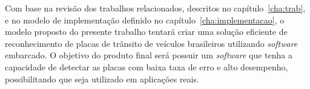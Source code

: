 Com base na revisão dos trabalhos relacionados, descritos no capítulo~\ref{cha:trab},
e no modelo de implementação definido no capítulo~\ref{cha:implementacao}, o modelo proposto
do presente trabalho tentará criar uma solução eficiente de reconhecimento de placas de trânsito
de veículos brasileiros utilizando \emph{software} embarcado. O objetivo do produto final será
possuir um \emph{software} que tenha a capacidade de detectar as placas com baixa taxa de erro
e alto desempenho, possibilitando que seja utilizado em aplicações reais.
